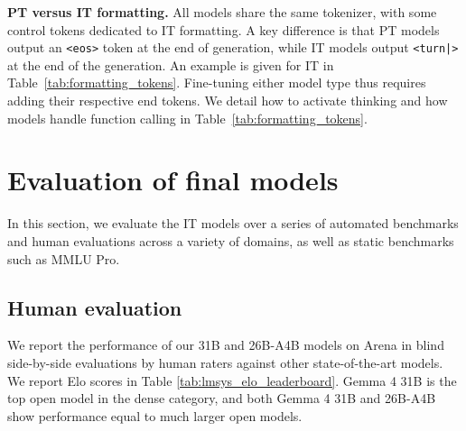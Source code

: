 \documentclass[11pt, a4paper, logo, twocolumn, copyright]{googledeepmind}
\begin{document}
\noindent\textbf{PT versus IT formatting.} 
All models share the same tokenizer, with some control tokens dedicated to IT formatting.
A key difference is that PT models output an \texttt{<eos>} token at the end of generation, while IT models output \texttt{<turn|>} at the end of the generation. An example is given for IT in Table~\ref{tab:formatting_tokens}.
Fine-tuning either model type thus requires adding their respective end tokens. We detail how to activate thinking and how models handle function calling in Table~\ref{tab:formatting_tokens}.


\section{Evaluation of final models}
\label{sec:evals}

In this section, we evaluate the IT models over a series of automated benchmarks and human evaluations across a variety of domains, as well as static benchmarks such as MMLU Pro.

\subsection{Human evaluation}

We report the performance of our 31B and 26B-A4B models on Arena \citep{chiang2024chatbot} in blind side-by-side evaluations by human raters against other state-of-the-art models. 
We report Elo scores in Table \ref{tab:lmsys_elo_leaderboard}. 
Gemma 4 31B is the top open model in the dense category, and both Gemma 4 31B and 26B-A4B show performance equal to much larger open models.
\end{document}
